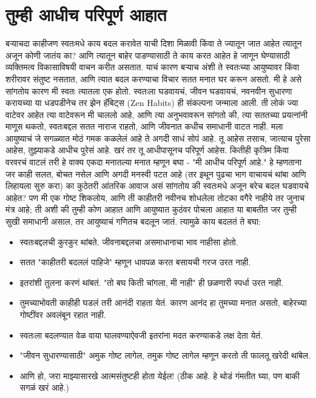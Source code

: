 \chapter{तुम्ही आधीच परिपूर्ण आहात}
बऱ्याचदा काहीजण स्वतःमधे काय बदल करावेत याची दिशा मिळावी किंवा ते ज्यातून जात आहेत त्यातून अजून कोणी जातंय का? आणि त्यातून बाहेर पाडण्यासाठी ते काय करत आहेत हे जाणून घेण्यासाठी व्यक्तिमत्व विकासाविषयी वाचन करीत असतात. याचं कारण बऱ्याच अंशी ते स्वतःच्या आयुष्यावर किंवा शरीरावर संतुष्ट नसतात, आणि त्यात बदल करण्याचा विचार सतत मनात घर करून असतो.
मी हे असे सांगतोय कारण मी स्वतः त्यातला एक होतो.
स्वतःला घडवायचं, जीवन घडवायचं, नवनवीन सुधारणा करायच्या या धडपडीनेच तर झेन हॅबिट्स (Zen Habits) ही संकल्पना जन्माला आली. ती लोकं ज्या वाटेवर आहेत त्या वाटेवरून मी चाललो आहे, आणि त्या अनुभवावरून सांगतो की,  त्या सततच्या प्रयत्नांनी माणूस थकतो, स्वतःबद्दल सतत नाराज राहतो, आणि जीवनात कधीच समाधानी वाटत नाही.
मला आयुष्याचं जे सगळ्यात मोठं गमक कळलेलं आहे ते अगदी साधं सोपं आहे.  तू आहेस तसाच, जात्याच पुरेसा आहेस, तुझ्याकडे आधीच पुरेसं आहे. खरं तर तू आधीपासूनच परिपूर्ण आहेस.
कितीही कृत्रिम किंवा वरवरचं वाटलं तरी हे वाक्य एकदा मनातल्या मनात म्हणून बघा - "मी आधीच परिपूर्ण आहे." हे म्हणताना जर काही सलत, बोचत नसेल आणि अगदी मनस्वी पटत आहे (तर इथून पुढचा भाग वाचायचं थांबा आणि लिहायला सुरु करा) का कुठेतरी आंतरिक आवाज असं सांगतोय की स्वतःमधे अजून बरेच बदल घडवायचे आहेत?
पण मी एक गोष्ट शिकलोय, आणि ती काहीतरी नवीनच शोधलेला तोटका वगैरे नाहीये तर जुनाच मंत्र आहे; ती अशी की तुम्ही कोण आहात आणि आयुष्यात कुठंवर पोचला आहात या बाबतीत जर तुम्ही सुखी समाधानी असाल, तर आयुष्याचं गणितच बदलून जातं.
त्यामुळे काय बदलतं ते बघा:
\begin{itemize}
 \item स्वतःबद्दलची कुरकुर थांबते. जीवनाबद्दलचा असमाधानाचा भाव नाहीसा होतो.
 \item सतत "काहीतरी बदललं पाहिजे" म्हणून धावपळ करत बसायची गरज उरत नाही.
 \item इतरांशी तुलना करणं थांबतं. "तो बघ किती चांगला, मी नाही" ही छळणारी स्पर्धा उरत नाही.
 \item तुमच्याभोवती काहीही घडलं तरी आनंदी राहता येतं. कारण आनंद हा तुमच्या मनात असतो, बाहेरच्या गोष्टींवर अवलंबून रहात नाही.
 \item स्वतःला बदलण्यात वेळ वाया घालवण्याऐवजी इतरांना मदत करण्याकडे लक्ष देता येतं.
 \item "जीवन सुधारण्यासाठी" अमुक गोष्ट लागेल, तमुक गोष्ट लागेल म्हणून करतो ती फालतू खरेदी थांबेल.
 \item आणि हो, जरा माझ्यासारखे आत्मसंतुष्टही होता येईल! (ठीक आहे. हे थोडं गंमतीत घ्या, पण बाकी सगळं खरं आहे.)
 \end{itemize}
